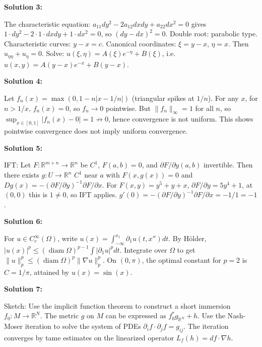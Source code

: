 \documentclass[12pt,a4paper]{exam}
\begin{document}
\vspace{0.5cm}

\textbf{Solution 3:}

The characteristic equation: $a_{11} dy^2 - 2a_{12} dx dy + a_{22} dx^2 = 0$ gives $1\cdot dy^2 - 2\cdot1\cdot dx dy + 1\cdot dx^2 = 0$, so $(dy - dx)^2 = 0$. Double root: parabolic type. Characteristic curves: $y - x = c$. Canonical coordinates: $\xi = y - x$, $\eta = x$. Then $u_{\eta\eta} + u_\eta = 0$. Solve: $u(\xi,\eta) = A(\xi) e^{-\eta} + B(\xi)$, i.e. $u(x,y) = A(y-x) e^{-x} + B(y-x)$.

\vspace{0.5cm}

\textbf{Solution 4:}

Let $f_n(x) = \max(0, 1 - n|x - 1/n|)$ (triangular spikes at $1/n$). For any $x$, for $n > 1/x$, $f_n(x) = 0$, so $f_n \to 0$ pointwise. But $\|f_n\|_\infty = 1$ for all $n$, so $\sup_{x \in [0,1]} |f_n(x) - 0| = 1 \not\to 0$, hence convergence is not uniform. This shows pointwise convergence does not imply uniform convergence.

\vspace{0.5cm}

\textbf{Solution 5:}

IFT: Let $F: \mathbb{R}^{m+n} \to \mathbb{R}^n$ be $C^1$, $F(a,b)=0$, and $\partial F/\partial y (a,b)$ invertible. Then there exists $g: U \to \mathbb{R}^n$ $C^1$ near $a$ with $F(x,g(x))=0$ and $Dg(x) = -(\partial F/\partial y)^{-1} \partial F/\partial x$. For $F(x,y) = y^5 + y + x$, $\partial F/\partial y = 5y^4 + 1$, at $(0,0)$ this is $1 \neq 0$, so IFT applies. $g'(0) = - (\partial F/\partial y)^{-1} \partial F/\partial x = -1/1 = -1$.

\vspace{0.5cm}

\textbf{Solution 6:}

For $u \in C_c^\infty(\Omega)$, write $u(x) = \int_{-\infty}^{x_1} \partial_1 u(t, x'') dt$. By H\"older, $|u(x)|^p \leq (\operatorname{diam}\Omega)^{p-1} \int |\partial_1 u|^p dt$. Integrate over $\Omega$ to get $\|u\|_p^p \leq (\operatorname{diam}\Omega)^p \|\nabla u\|_p^p$. On $(0,\pi)$, the optimal constant for $p=2$ is $C = 1/\pi$, attained by $u(x) = \sin(x)$.

\vspace{0.5cm}

\textbf{Solution 7:}

Sketch: Use the implicit function theorem to construct a short immersion $f_0: M \to \mathbb{R}^N$. The metric $g$ on $M$ can be expressed as $f_0^*g_{\mathbb{R}^N} + h$. Use the Nash-Moser iteration to solve the system of PDEs $\partial_i f \cdot \partial_j f = g_{ij}$. The iteration converges by tame estimates on the linearized operator $L_f(h) = df \cdot \nabla h$.
\end{document}
